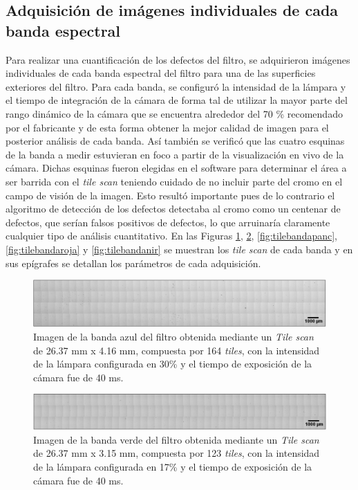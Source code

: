 \singlespacing
\subsection{Adquisición de imágenes individuales de cada banda espectral}

\hspace{0.5cm}Para realizar una cuantificación de los defectos del filtro, se adquirieron imágenes individuales de cada banda espectral del filtro para una de las superficies exteriores del filtro. Para cada banda, se configuró la intensidad de la lámpara y el tiempo de integración de la cámara de forma tal de utilizar la mayor parte del rango dinámico de la cámara que se encuentra alrededor del 70 \% recomendado por el fabricante y de esta forma obtener la mejor calidad de imagen para el posterior análisis de cada banda. Así también se verificó que las cuatro esquinas de la banda a medir estuvieran en foco a partir de la visualización en vivo de la cámara. Dichas esquinas fueron elegidas en el software para determinar el área a ser barrida con el \textit{tile scan} teniendo cuidado de no incluir parte del cromo en el campo de visión de la imagen. Esto resultó importante pues de lo contrario el algoritmo de detección de los defectos detectaba al cromo como un centenar de defectos, que serían falsos positivos de defectos, lo que arruinaría claramente cualquier tipo de análisis cuantitativo. En las Figuras \ref{fig:tilebandaazul}, \ref{fig:tilebandaverde}, \ref{fig:tilebandapanc}, \ref{fig:tilebandaroja} y \ref{fig:tilebandanir} se muestran los \textit{tile scan} de cada banda y en sus epígrafes se detallan los parámetros de cada adquisición.
\begin{figure}[H]
	\centering
	\includegraphics[width=1.0\textwidth]{Figs/cuantificaciondefectos/banda_AZUL.png}
	\caption{Imagen de la banda azul del filtro obtenida mediante un \textit{Tile scan} de 26.37 mm x 4.16 mm, compuesta por 164 \textit{tiles}, con la intensidad de la lámpara configurada en 30\% y el tiempo de exposición de la cámara fue de 40 ms.}
	\label{fig:tilebandaazul}
\end{figure}
\begin{figure}[H]
	\centering
	\includegraphics[width=1.0\textwidth]{Figs/cuantificaciondefectos/banda_VERDE.png}
	\caption{Imagen de la banda verde del filtro obtenida mediante un \textit{Tile scan} de 26.37 mm x 3.15 mm, compuesta por 123 \textit{tiles}, con la intensidad de la lámpara configurada en 17\% y el tiempo de exposición de la cámara fue de 40 ms.}
	\label{fig:tilebandaverde}
\end{figure}
